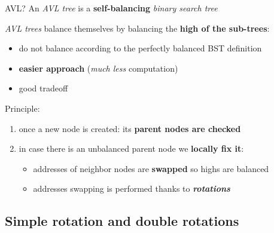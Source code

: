 \documentclass{beamer}[10pt, usepdftitle=false, handout]
\begin{document}
	\begin{frame}	
	
	\begin{block}{AVL?}
	An \textit{AVL tree} is a \textbf{self-balancing} \textit{binary search tree}
	\end{block}
	
	\vspace*{1em}	
	
	\textit{AVL trees} balance themselves by balancing the \textbf{high of the sub-trees}:
	\begin{itemize}
	\item {do not balance according to the perfectly balanced BST definition}
	\item {\textbf{easier approach} (\textit{much less} computation)}
	\item {good tradeoff}
	\end{itemize}
		
	\vspace*{1em}		
		
	Principle:	
	
	\begin{enumerate}
	\item {once a new node is created: its \textbf{parent nodes are checked}}
	\item {in case there is an unbalanced parent node we \textbf{locally fix it}:
		\begin{itemize}
			\item {addresses of neighbor nodes are \textbf{swapped} so highs are balanced}
			\item {addresses swapping is performed thanks to \textbf{\textit{rotations}}} 
			
		\end{itemize}			
	}
	\end{enumerate}		
	
	\end{frame}	
	
	\subsection{Simple rotation and double rotations}
	
\end{document}
